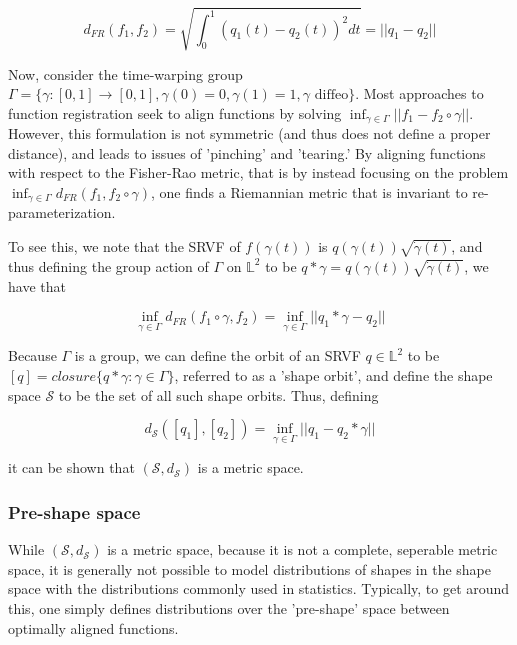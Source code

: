 \documentclass[]{article}
\begin{document}
\begin{equation*}
	d_{FR}(f_1,f_2) = \sqrt{\int_0^1 (q_1(t) - q_2(t))^2 dt} = ||q_1 - q_2|| 
\end{equation*}

Now, consider the time-warping group $\Gamma = \{\gamma: [0,1] \to [0,1], \gamma(0) = 0, \gamma(1) = 1, \gamma \text{ diffeo}\}$. Most approaches to function registration seek to align functions by solving $\inf_{\gamma \in \Gamma} ||f_1 - f_2 \circ \gamma||$. However, this formulation is not symmetric (and thus does not define a proper distance), and leads to issues of 'pinching' and 'tearing.' By aligning functions with respect to the Fisher-Rao metric, that is by instead focusing on the problem $\inf_{\gamma \in \Gamma} d_{FR}(f_1,f_2 \circ \gamma)$, one finds a Riemannian metric that is invariant to re-parameterization. 

To see this, we note that the SRVF of $f(\gamma(t))$ is $q(\gamma(t))\sqrt{\dot{\gamma}(t)}$, and thus defining the group action of $\Gamma$ on $\mathbb{L}^2$ to be $q * \gamma = q(\gamma(t))\sqrt{\dot{\gamma}(t)}$, we have that

    \begin{equation*}
    	\inf_{\gamma \in \Gamma} d_{FR}(f_1 \circ \gamma, f_2) = \inf_{\gamma \in \Gamma} ||q_1 * \gamma - q_2||
    \end{equation*}

Because $\Gamma$ is a group, we can define the orbit of an SRVF $q \in \mathbb{L}^2$ to be $[q] = closure\{q * \gamma : \gamma \in \Gamma \}$, referred to as a 'shape orbit', and define the shape space $\mathcal{S}$ to be the set of all such shape orbits. Thus, defining

\begin{equation}
	d_\mathcal{S}([q_1],[q_2]) = \inf_{\gamma \in \Gamma} ||q_1 - q_2 * \gamma||
\end{equation}      

it can be shown that $(\mathcal{S},d_\mathcal{S})$ is a metric space.

\subsubsection{Pre-shape space}

While $(\mathcal{S},d_\mathcal{S})$ is a metric space, because it is not a complete, seperable metric space, it is generally not possible to model distributions of shapes in the shape space with the distributions commonly used in statistics. Typically, to get around this, one simply defines distributions over the 'pre-shape' space between optimally aligned functions.   
\end{document}
